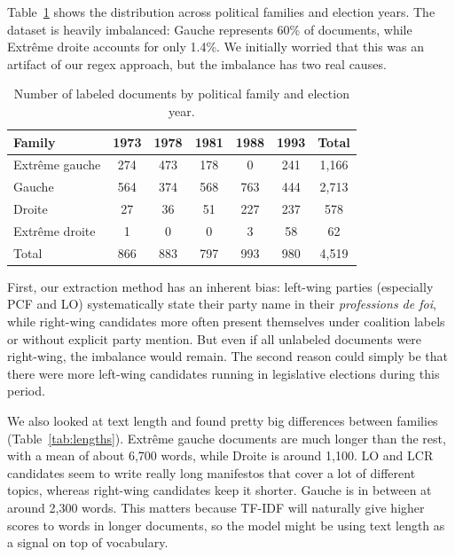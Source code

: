 \documentclass{article}
\begin{document}
Table~\ref{tab:distribution} shows the distribution across political families and election years. The dataset is heavily imbalanced: Gauche represents 60\%
of documents, while Extr\^{e}me droite accounts for only 1.4\%. We initially worried that this was an artifact of our regex approach, but the imbalance has two real causes.  
\begin{table}[h]
  \caption{Number of labeled documents by political family and election year.}
  \label{tab:distribution}
  \centering
  \begin{tabular}{lccccc|c}
    \toprule
    Family & 1973 & 1978 & 1981 & 1988 & 1993 & Total \\
    \midrule
    Extr\^{e}me gauche & 274 & 473 & 178 & 0 & 241 & 1{,}166 \\
    Gauche              & 564 & 374 & 568 & 763 & 444 & 2{,}713 \\
    Droite              & 27  & 36  & 51  & 227 & 237 & 578 \\
    Extr\^{e}me droite  & 1   & 0   & 0   & 3   & 58  & 62 \\
    \midrule
    Total               & 866 & 883 & 797 & 993 & 980 & 4{,}519 \\
    \bottomrule
  \end{tabular}
\end{table}

First, our extraction method has an inherent bias: left-wing parties (especially PCF and LO) systematically state their party name in their \textit{professions de foi}, while right-wing candidates more often present themselves under coalition labels or without explicit party mention. But even if all unlabeled documents were right-wing, the imbalance would remain. The second reason could simply be that there were more left-wing candidates running in legislative elections during this period.

We also looked at text length and found pretty big differences between families (Table~\ref{tab:lengths}). Extr\^{e}me gauche documents are much longer than the rest, with a mean of about 6{,}700 words, while Droite is around 1{,}100. LO and LCR candidates seem to write really long manifestos that cover a lot of different topics, whereas right-wing candidates keep it shorter. Gauche is in between at around 2{,}300 words. This matters because TF-IDF will naturally give higher scores to words in longer documents, so the model might be using text length as a signal on top of vocabulary.
\end{document}
